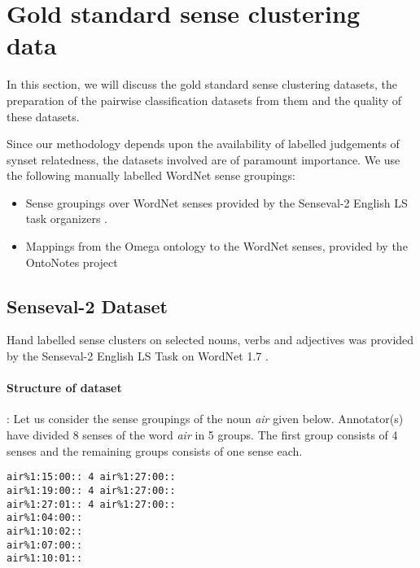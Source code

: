 \section{Gold standard sense clustering data}
\label{section:goldStandardDatasets}
In this section, we will discuss the gold standard sense clustering datasets, the preparation of the pairwise classification datasets from them and the quality of these datasets.

Since our methodology depends upon the availability of labelled judgements of synset relatedness, the datasets involved are of paramount importance. 
We use the following manually labelled WordNet sense groupings:
\begin{itemize}
\item Sense groupings over WordNet senses provided by the Senseval-2 English LS task organizers  \citep{Senseval2LexicalSampleTask}.
\item Mappings from the Omega ontology \citep{philpot2005omega} to the WordNet senses, provided by the OntoNotes project \citep{Hovy:2006}
\end{itemize}

\subsection{Senseval-2 Dataset}
Hand labelled sense clusters on selected nouns, verbs and adjectives was provided by the Senseval-2 English LS Task on WordNet 1.7 \citep{Senseval2LexicalSampleTask} \citep{Edmonds:2001}. 

\paragraph{Structure of dataset}: Let us consider the sense groupings of the noun \textit{air} given below. Annotator(s) have divided 8 senses of the word \textit{air} in 5 groups. The first group consists of 4 senses and the remaining groups consists of one sense each.

\begin{verbatim}
air%1:15:00:: 4 air%1:27:00::
air%1:19:00:: 4 air%1:27:00::
air%1:27:01:: 4 air%1:27:00::
air%1:04:00::
air%1:10:02::
air%1:07:00::
air%1:10:01::
\end{verbatim}

